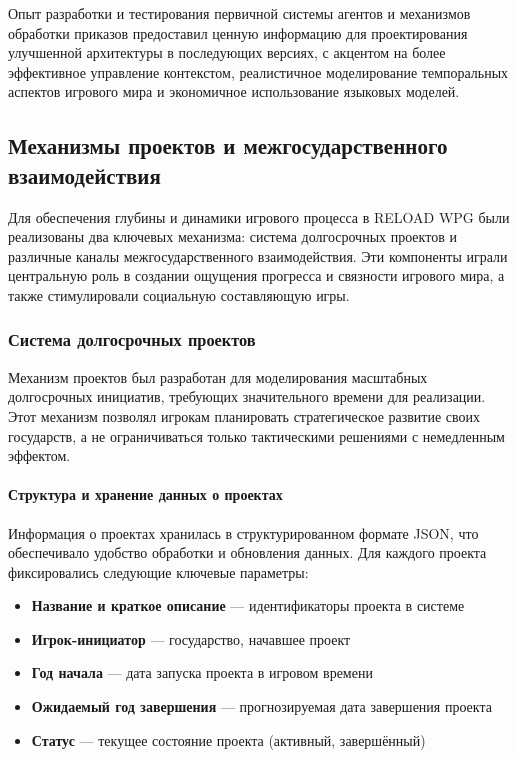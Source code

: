 Опыт разработки и тестирования первичной системы агентов и механизмов обработки приказов предоставил ценную информацию для проектирования улучшенной архитектуры в последующих версиях, с акцентом на более эффективное управление контекстом, реалистичное моделирование темпоральных аспектов игрового мира и экономичное использование языковых моделей.

\subsection{Механизмы проектов и межгосударственного взаимодействия}

Для обеспечения глубины и динамики игрового процесса в RELOAD WPG были реализованы два ключевых механизма: система долгосрочных проектов и различные каналы межгосударственного взаимодействия. Эти компоненты играли центральную роль в создании ощущения прогресса и связности игрового мира, а также стимулировали социальную составляющую игры.

\subsubsection{Система долгосрочных проектов}

Механизм проектов был разработан для моделирования масштабных долгосрочных инициатив, требующих значительного времени для реализации. Этот механизм позволял игрокам планировать стратегическое развитие своих государств, а не ограничиваться только тактическими решениями с немедленным эффектом.

\paragraph{Структура и хранение данных о проектах}

Информация о проектах хранилась в структурированном формате JSON, что обеспечивало удобство обработки и обновления данных. Для каждого проекта фиксировались следующие ключевые параметры:

\begin{itemize}
    \item \textbf{Название и краткое описание} — идентификаторы проекта в системе
    \item \textbf{Игрок-инициатор} — государство, начавшее проект
    \item \textbf{Год начала} — дата запуска проекта в игровом времени
    \item \textbf{Ожидаемый год завершения} — прогнозируемая дата завершения проекта
    \item \textbf{Статус} — текущее состояние проекта (активный, завершённый)
\end{itemize}

